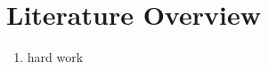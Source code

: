 \chapter{Literature Overview}\label{ch:Literature}

\begin{enumerate}
	\item hard work
\end{enumerate}